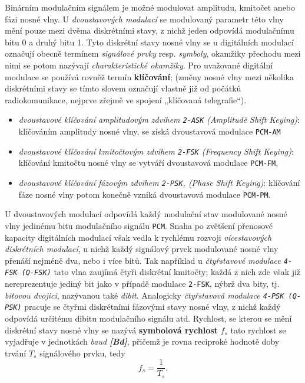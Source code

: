       Binárním modulačním signálem je možné modulovat amplitudu, kmitočet anebo fázi nosné vlny. U 
      \emph{dvoustavových modulací} se modulovaný parametr této vlny mění pouze mezi dvěma 
      diskrétními stavy, z nichž jeden odpovídá modulačnímu bitu 0 a druhý bitu 1. Tyto diskrétní 
      stavy nosné vlny se u digitálních modulací označují obecně termínem \emph{signálové prvky} 
      resp. \emph{symboly}, okamžiky přechodu mezi nimi se potom nazývají \emph{charakteristické 
      okamžiky}. Pro uvažované digitální modulace se používá rovněž termín \textbf{klíčování}; 
      (změny nosné vlny mezi několika diskrétními stavy se tímto slovem označují vlastně již od 
      počátků radiokomunikace, nejprve zřejmě ve spojení „klíčovaná telegrafie“).
      \begin{itemize}
        \item \emph{dvoustavové klíčování amplitudovým zdvihem \texttt{2-ASK} (Amplitudě Shift  
              Keying)}: klíčováním amplitudy nosné vlny, se získá dvoustavová modulace 
              \texttt{PCM-AM}
        \item \emph{dvoustavové klíčování kmitočtovým zdvihem \texttt{2-FSK} (Frequency Shift  
              Keying)}: klíčování kmitočtu nosné vlny se vytváří dvoustavová modulace 
              \texttt{PCM-FM},
        \item \emph{dvoustavové klíčování fázovým zdvihem \texttt{2-PSK}, (Phase Shift Keying)}: 
              klíčování fáze nosné vlny potom konečně vzniká dvoustavová modulace \texttt{PCM-PM}.
      \end{itemize}
      U dvoustavových modulací odpovídá každý modulační stav modulované nosné vlny jedinému bitu 
      modulačního signálu \texttt{PCM}. Snaha po zvětšení přenosové kapacity digitálních modulací 
      však vedla k rychlému rozvoji \emph{vícestavových diskrétních modulací}, u nichž každý 
      signálový prvek modulované nosné vlny přenáší nejméně dva, nebo i více bitů. Tak například u 
      \emph{čtyřstavové modulace \texttt{4-FSK (Q-FSK)}} tato vlna zaujímá čtyři diskrétní 
      kmitočty; každá z nich zde však již nereprezentuje jediný bit jako v případě modulace 
      \texttt{2-FSK}, nýbrž dva bity, tj. \emph{bitovou dvojici}, nazývanou také \emph{dibit}. 
      Analogicky   \emph{čtyřstavová modulace \texttt{4-PSK (Q-PSK)}} pracuje se čtyřmi diskrétními 
      fázovými 
      stavy nosné vlny, z nichž každý odpovídá určitému dibitu modulačního signálu atd. Rychlost, 
      se kterou se mění diskrétní stavy nosné vlny se nazývá \textbf{symbolová rychlost} \(f_s\) 
      tato rychlost se vyjadřuje v jednotkách \emph{baud \textbf{[Bd]}}, přičemž je rovna reciproké 
      hodnotě doby trvání \(T_s\) signálového prvku, tedy\[f_s = \frac{1}{T_s}.\]
      
